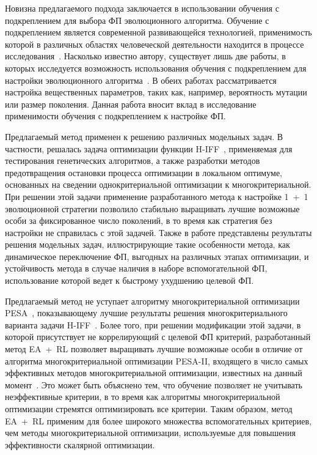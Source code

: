 Новизна предлагаемого подхода заключается в использовании обучения с подкреплением для выбора ФП эволюционного алгоритма. Обучение с подкреплением является современной развивающейся технологией, применимость которой в различных областях человеческой деятельности находится в процессе исследования~\cite{gosavi, survey}. Насколько известно автору, существует лишь две работы, в которых исследуется возможность использования обучения с подкреплением для настройки эволюционного алгоритма~\cite{ea-rl, es-rl}. В обеих работах рассматривается настройка вещественных параметров, таких как, например, вероятность мутации или размер поколения. Данная работа вносит вклад в исследование применимости обучения с подкреплением к настройке ФП. 

Предлагаемый метод применен к решению различных модельных задач. В частности, решалась задача оптимизации функции H-IFF~\cite{h-iff}, применяемая для тестирования генетических алгоритмов, а также разработки методов предотвращения остановки процесса оптимизации в локальном оптимуме, основанных на сведении однокритериальной оптимизации к многокритериальной. При решении этой задачи применение разработанного метода к настройке 1~+~1 эволюционной стратегии \cite{nature-inspired, essentials, skobtsov} позволило стабильно выращивать лучшие возможные особи за фиксированное число поколений, в то время как стратегия без настройки не справилась с этой задачей.
Также в работе представлены результаты решения модельных задач, иллюстрирующие такие особенности метода, как динамическое переключение ФП, выгодных на различных этапах оптимизации, и устойчивость метода в случае наличия в наборе вспомогательной ФП, использование которой ведет к быстрому ухудшению целевой ФП.

Предлагаемый метод не уступает алгоритму многокритериальной оптимизации PESA~\cite{pesa}, показывающему лучшие результаты решения многокритериального варианта задачи H-IFF~\cite{mh-iff}. Более того, при решении  модификации этой задачи, в которой присутствует не коррелирующий с целевой ФП критерий, разработанный метод EA~+~RL позволяет выращивать лучшие возможные особи в отличие от алгоритма многокритериальной оптимизации PESA-II, входящего в число самых эффективных методов многокритериальной оптимизации, известных на данный момент~\cite{pesa-ii, coello}. Это может быть объяснено тем, что обучение позволяет не учитывать неэффективные критерии, в то время как алгоритмы многокритериальной оптимизации стремятся оптимизировать все критерии. Таким образом, метод EA~+~RL применим для более широкого множества вспомогательных критериев, чем методы многокритериальной оптимизации, используемые для повышения эффективности скалярной оптимизации.
